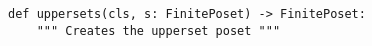\begin{verbatim}
def uppersets(cls, s: FinitePoset) -> FinitePoset:
    """ Creates the upperset poset """
\end{verbatim}